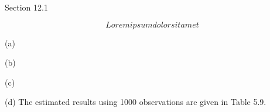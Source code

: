 \documentclass{homework}
\begin{document}
\maketitle



\begin{homeworkChapter}{Section 12.1}

\begin{homeworkProblem} 

\lipsum[1] %

$$Lorem ipsum dolor sit amet$$

\vspace{-5pt} \begin{homeworkSection}{(a)}
 \lipsum[2]

\problemAnswer{ 
} \end{homeworkSection}

\begin{homeworkSection}{(b)}
\lipsum[3]

\problemAnswer{ 
} \end{homeworkSection}

\begin{homeworkSection}{(c)}
\lipsum[9]

\problemAnswer{ 
} \end{homeworkSection}

\begin{homeworkSection}{(d)}
The estimated results using 1000 observations are given in Table 5.9.

\problemAnswer{ 
\lipsum[10]
} \end{homeworkSection}

\end{homeworkProblem}



\end{homeworkChapter}
\end{document}
